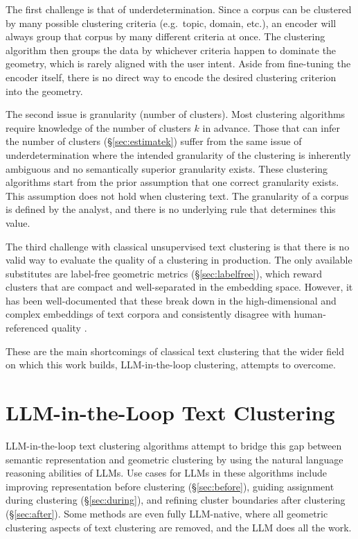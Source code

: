 \documentclass[11pt,a4paper,oneside]{report}
\begin{document}
The first challenge is that of underdetermination. Since a corpus can be clustered by many possible clustering criteria (e.g.\ topic, domain, etc.), an encoder will always group that corpus by many different criteria at once. The clustering algorithm then groups the data by whichever criteria happen to dominate the geometry, which is rarely aligned with the user intent. Aside from fine-tuning the encoder itself, there is no direct way to encode the desired clustering criterion into the geometry.

The second issue is granularity (number of clusters). Most clustering algorithms require knowledge of the number of clusters $k$ in advance. Those that can infer the number of clusters (\S\ref{sec:estimatek}) suffer from the same issue of underdetermination where the intended granularity of the clustering is inherently ambiguous and no semantically superior granularity exists. These clustering algorithms start from the prior assumption that one correct granularity exists. This assumption does not hold when clustering text. The granularity of a corpus is defined by the analyst, and there is no underlying rule that determines this value.

The third challenge with classical unsupervised text clustering is that there is no valid way to evaluate the quality of a clustering in production. The only available substitutes are label-free geometric metrics (\S\ref{sec:labelfree}), which reward clusters that are compact and well-separated in the embedding space. However, it has been well-documented that these break down in the high-dimensional and complex embeddings of text corpora and consistently disagree with human-referenced quality \citep{petukhova2025text,wang2025deep}.

These are the main shortcomings of classical text clustering that the wider field on which this work builds, LLM-in-the-loop clustering, attempts to overcome.

\section{LLM-in-the-Loop Text Clustering}

LLM-in-the-loop text clustering algorithms attempt to bridge this gap between semantic representation and geometric clustering by using the natural language reasoning abilities of LLMs. Use cases for LLMs in these algorithms include improving representation before clustering (\S\ref{sec:before}), guiding assignment during clustering (\S\ref{sec:during}), and refining cluster boundaries after clustering (\S\ref{sec:after}). Some methods are even fully LLM-native, where all geometric clustering aspects of text clustering are removed, and the LLM does all the work.
\end{document}
